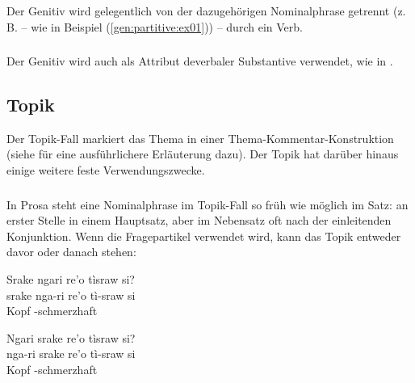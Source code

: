 \noindent{} 
\label{syn:partitive-gen}

\subsubsection{} Der Genitiv wird gelegentlich von der dazugehörigen Nominalphrase getrennt (z. B. -- wie in Beispiel (\ref{gen:partitive:ex01})) -- durch ein Verb.

\subsubsection{} Der Genitiv wird auch als Attribut deverbaler Substantive verwendet, wie in  .

\subsection{Topik} Der Topik-Fall markiert das Thema in einer Thema-Kommentar-Konstruktion (siehe  für eine ausführlichere Erläuterung dazu).
Der Topik hat darüber hinaus einige weitere feste Verwendungszwecke.

\subsubsection{} \label{syn!topical!word-order}
In Prosa steht eine Nominalphrase im Topik-Fall so früh wie möglich im Satz: an erster Stelle in einem Hauptsatz, aber im Nebensatz oft nach der einleitenden Konjunktion. Wenn die Fragepartikel  verwendet wird, kann das Topik entweder davor oder danach stehen:

\begin{interlin}
	\glll Srake ngari re'o tìsraw si? \\
	srake nga-ri re'o tì-sraw si \\
	  Kopf -schmerzhaft  \\
\end{interlin}

\begin{interlin}
	\glll Ngari srake re'o tìsraw si? \\
	nga-ri srake re'o tì-sraw si \\
	  Kopf -schmerzhaft  \\
\end{interlin}

